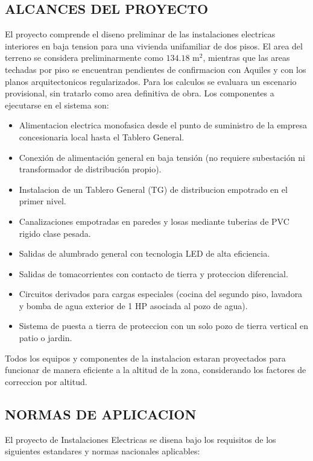 \subsection{ALCANCES DEL PROYECTO}

El proyecto comprende el diseno preliminar de las instalaciones electricas interiores en baja tension para una vivienda unifamiliar de dos pisos. El area del terreno se considera preliminarmente como \(134.18\text{ m}^2\), mientras que las areas techadas por piso se encuentran pendientes de confirmacion con Aquiles y con los planos arquitectonicos regularizados. Para los calculos se evaluara un escenario provisional, sin tratarlo como area definitiva de obra. Los componentes a ejecutarse en el sistema son:

\begin{itemize}
  \item Alimentacion electrica monofasica desde el punto de suministro de la empresa concesionaria local hasta el Tablero General.
  \item Conexión de alimentación general en baja tensión (no requiere subestación ni transformador de distribución propio).
  \item Instalacion de un Tablero General (TG) de distribucion empotrado en el primer nivel.
  \item Canalizaciones empotradas en paredes y losas mediante tuberias de PVC rigido clase pesada.
  \item Salidas de alumbrado general con tecnologia LED de alta eficiencia.
  \item Salidas de tomacorrientes con contacto de tierra y proteccion diferencial.
  \item Circuitos derivados para cargas especiales (cocina del segundo piso, lavadora y bomba de agua exterior de 1 HP asociada al pozo de agua).
  \item Sistema de puesta a tierra de proteccion con un solo pozo de tierra vertical en patio o jardin.
\end{itemize}

Todos los equipos y componentes de la instalacion estaran proyectados para funcionar de manera eficiente a la altitud de la zona, considerando los factores de correccion por altitud.

\subsection{NORMAS DE APLICACION}

El proyecto de Instalaciones Electricas se disena bajo los requisitos de los siguientes estandares y normas nacionales aplicables:


